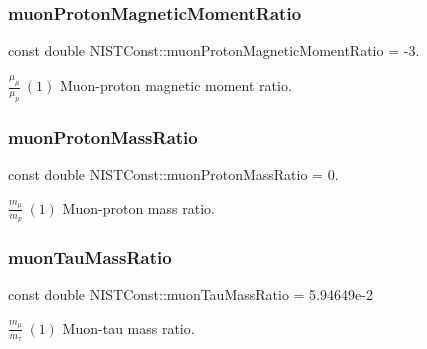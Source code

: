 \subsubsection{\texorpdfstring{muon\+Proton\+Magnetic\+Moment\+Ratio}{muonProtonMagneticMomentRatio}}
{\footnotesize\ttfamily const double N\+I\+S\+T\+Const\+::muon\+Proton\+Magnetic\+Moment\+Ratio = -\/3.}

$\frac{\mu_\mu}{\mu_p} \ (1)$ Muon-\/proton magnetic moment ratio. \mbox{\label{group___n_i_s_t_const-_muon_ga72ca5408215ae40bb36ef1bff9107cf7}} 
\subsubsection{\texorpdfstring{muon\+Proton\+Mass\+Ratio}{muonProtonMassRatio}}
{\footnotesize\ttfamily const double N\+I\+S\+T\+Const\+::muon\+Proton\+Mass\+Ratio = 0.}

$\frac{m_\mu}{m_p} \ (1)$ Muon-\/proton mass ratio. \mbox{\label{group___n_i_s_t_const-_muon_gaaf24aa0c43f6d4a1935963fdd4c44789}} 
\subsubsection{\texorpdfstring{muon\+Tau\+Mass\+Ratio}{muonTauMassRatio}}
{\footnotesize\ttfamily const double N\+I\+S\+T\+Const\+::muon\+Tau\+Mass\+Ratio = 5.\+94649e-\/2}

$\frac{m_\mu}{m_\tau} \ (1)$ Muon-\/tau mass ratio. 